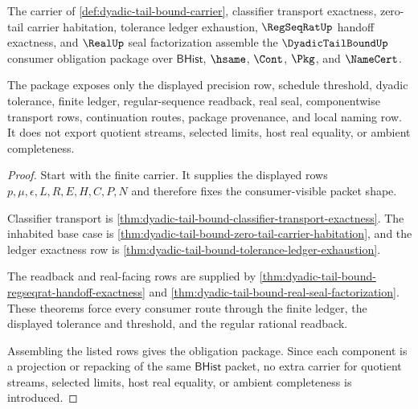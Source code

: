 \begin{theorem}
\label{thm:dyadic-tail-bound-consumer-obligation-package}
The carrier of \autoref{def:dyadic-tail-bound-carrier}, classifier transport exactness, zero-tail carrier habitation, tolerance ledger exhaustion, $\RegSeqRatUp$ handoff exactness, and $\RealUp$ seal factorization assemble the $\DyadicTailBoundUp$ consumer obligation package over $\mathsf{BHist}$, $\hsame$, $\Cont$, $\Pkg$, and $\NameCert$.

The package exposes only the displayed precision row, schedule threshold, dyadic tolerance, finite ledger, regular-sequence readback, real seal, componentwise transport rows, continuation routes, package provenance, and local naming row. It does not export quotient streams, selected limits, host real equality, or ambient completeness.
\end{theorem}
\begin{proof}
Start with the finite carrier. It supplies the displayed rows $p,\mu,\epsilon,L,R,E,H,C,P,N$ and therefore fixes the consumer-visible packet shape.

Classifier transport is \autoref{thm:dyadic-tail-bound-classifier-transport-exactness}. The inhabited base case is \autoref{thm:dyadic-tail-bound-zero-tail-carrier-habitation}, and the ledger exactness row is \autoref{thm:dyadic-tail-bound-tolerance-ledger-exhaustion}.

The readback and real-facing rows are supplied by \autoref{thm:dyadic-tail-bound-regseqrat-handoff-exactness} and \autoref{thm:dyadic-tail-bound-real-seal-factorization}. These theorems force every consumer route through the finite ledger, the displayed tolerance and threshold, and the regular rational readback.

Assembling the listed rows gives the obligation package. Since each component is a projection or repacking of the same $\mathsf{BHist}$ packet, no extra carrier for quotient streams, selected limits, host real equality, or ambient completeness is introduced.
\end{proof}


